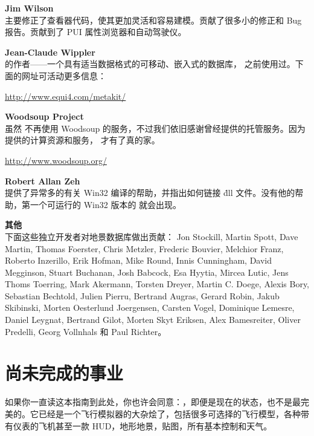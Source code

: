 \noindent \textbf{Jim Wilson}\\
主要修正了查看器代码，使其更加灵活和容易建模。贡献了很多小的修正和 Bug 报告。贡献到了 PUI 属性浏览器和自动驾驶仪。
 \medskip

\noindent \textbf{Jean-Claude Wippler}\\
 的作者——一个具有适当数据格式的可移动、嵌入式的数据库，\FlightGear{} 之前使用过。下面的网址可活动更多信息：
 \medskip

  \href{http://www.equi4.com/metakit/}{http://www.equi4.com/metakit/}
  \medskip
  
\noindent \textbf{Woodsoup Project}\\
虽然 \FlightGear{} 不再使用 Woodsoup 的服务，不过我们依旧感谢曾经提供的托管服务。因为提供的计算资源和服务，\FlightGear{} 才有了真的家。

\href{http://www.woodsoup.org/}{http://www.woodsoup.org/}
  \medskip

\noindent \textbf{Robert Allan Zeh}\\
提供了异常多的有关  Win32 编译的帮助，并指出如何链接 \.dll 文件。没有他的帮助，第一个可运行的 Win32 版本的 \FlightGear{} 就会出现。
  \medskip

\noindent \textbf{其他}\\
下面这些独立开发者对地景数据库做出贡献：
   Jon Stockill, Martin Spott, Dave Martin, Thomas Foerster, Chris Metzler, Frederic
   Bouvier, Melchior Franz, Roberto Inzerillo, Erik Hofman, Mike Round,
   Innis Cunningham, David Megginson, Stuart Buchanan, Josh Babcock,
   Esa Hyytia, Mircea Lutic, Jens Thoms Toerring, Mark Akermann,
   Torsten Dreyer, Martin C. Doege, Alexis Bory, Sebastian Bechtold,
   Julien Pierru, Bertrand Augras, Gerard Robin, Jakub Skibinski,
   Morten Oesterlund Joergensen, Carsten Vogel, Dominique Lemesre,
   Daniel Leygnat, Bertrand Gilot, Morten Skyt Eriksen, Alex
   Bamesreiter, Oliver Predelli, Georg Vollnhals 和  Paul Richter。

\section{尚未完成的事业}

如果你一直读这本指南到此处，你也许会同意：\FlightGear{}，即便是现在的状态，也不是最完美的。它已经是一个飞行模拟器的大杂烩了，包括很多可选择的飞行模型，各种带有仪表的飞机甚至一款 HUD，地形地景，贴图，所有基本控制和天气。

